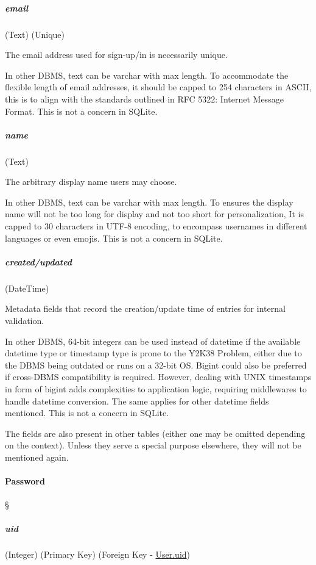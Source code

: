 \subparagraph{email}
(Text) (Unique) \label{data-layer.design.user.tables.user.email}

The email address used for sign-up/in is necessarily unique.

\textdagger{} In other DBMS, text can be varchar with max length. To accommodate
the flexible length of email addresses, it should be capped to 254 characters in
ASCII, this is to align with the standards outlined in RFC 5322: Internet
Message Format. This is not a concern in SQLite.

\subparagraph{name}
(Text) \label{data-layer.design.user.tables.user.name}

The arbitrary display name users may choose.

\textdagger{} In other DBMS, text can be varchar with max length. To ensures the
display name will not be too long for display and not too short for
personalization, It is capped to 30 characters in UTF-8 encoding, to encompass
usernames in different languages or even emojis. This is not a concern in SQLite.

\subparagraph{created/updated}
(DateTime) \label{data-layer.design.user.tables.user.meta}

Metadata fields that record the creation/update time of entries for internal validation.

\textdagger{} In other DBMS, 64-bit integers can be used instead of datetime if the
available datetime type or timestamp type is prone to the Y2K38 Problem, either
due to the DBMS being outdated or runs on a 32-bit OS. Bigint could also be preferred
if cross-DBMS compatibility is required. However, dealing with UNIX timestamps in
form of bigint adds complexities to application logic, requiring middlewares to
handle datetime conversion. The same applies for other datetime fields mentioned.
This is not a concern in SQLite.

The fields are also present in other tables (either one may be omitted depending
on the context). Unless they serve a special purpose elsewhere, they will not be
mentioned again.

\paragraph{Password}
\S{} \label{data-layer.design.user.tables.pswd}

\subparagraph{uid}
(Integer) (Primary Key) (Foreign Key - \hyperref[data-layer.design.user.tables.user.uid]{User.uid})
\label{data-layer.design.user.tables.pswd.uid}

